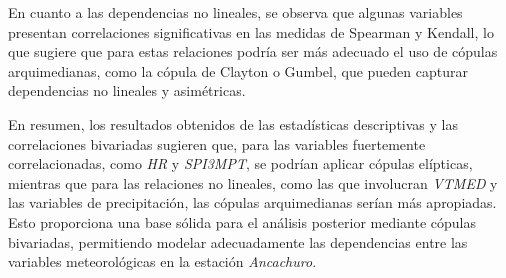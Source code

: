 En cuanto a las dependencias no lineales, se observa que algunas variables presentan correlaciones significativas en las medidas de Spearman y Kendall, lo que sugiere que para estas relaciones podría ser más adecuado el uso de cópulas arquimedianas, como la cópula de Clayton o Gumbel, que pueden capturar dependencias no lineales y asimétricas.

En resumen, los resultados obtenidos de las estadísticas descriptivas y las correlaciones bivariadas sugieren que, para las variables fuertemente correlacionadas, como \textit{HR} y \textit{SPI3MPT}, se podrían aplicar cópulas elípticas, mientras que para las relaciones no lineales, como las que involucran \textit{VTMED} y las variables de precipitación, las cópulas arquimedianas serían más apropiadas. Esto proporciona una base sólida para el análisis posterior mediante cópulas bivariadas, permitiendo modelar adecuadamente las dependencias entre las variables meteorológicas en la estación \textit{Ancachuro}.




